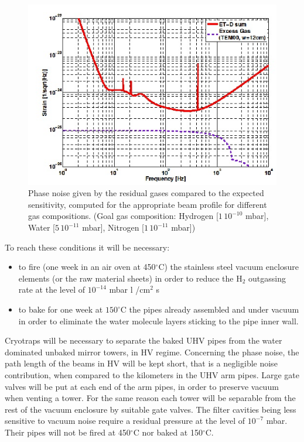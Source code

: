 \begin{figure}
\begin{center}
\includegraphics{Sec_SiteInfra/Figures/VAC3.jpg}
\caption{Phase noise given by the residual gases compared to the expected sensitivity, computed for the appropriate beam profile for different gas compositions. (Goal gas composition: Hydrogen [$1\,10^{-10}$ mbar], Water [$5\,10^{-11}$ mbar], Nitrogen [$1\,10^{-11}$ mbar])}
\label{fig:vac3}
\end{center}
\end{figure}


To reach these conditions it will be necessary:

\begin{itemize}
\item to fire (one week in an air oven at 450$^\circ$C) the stainless steel vacuum enclosure elements (or the raw material sheets) in order to reduce the H$_2$ outgassing rate at the level of $10^{-14}$ mbar l /cm$^{2}$ s
\item to bake for one week at $150^\circ$C the pipes already assembled and under vacuum in order to eliminate the water molecule layers sticking to the pipe inner wall.
\end{itemize}


Cryotraps will be necessary to separate the baked UHV pipes from the water dominated unbaked mirror towers, in HV regime. Concerning the phase noise, the path length of the beams in HV will be kept short, that is a negligible noise contribution, when compared to the kilometers in the UHV arm pipes.
Large gate valves will be put at each end of the arm pipes, in order to preserve vacuum when venting a tower. For the same reason each tower will be separable from the rest of the vacuum enclosure by suitable gate valves.
The filter cavities being less sensitive to vacuum noise require a residual pressure at the level of $10^{-7}$ mbar. Their pipes will not be fired at 450$^\circ$C nor baked at 150$^\circ$C.

